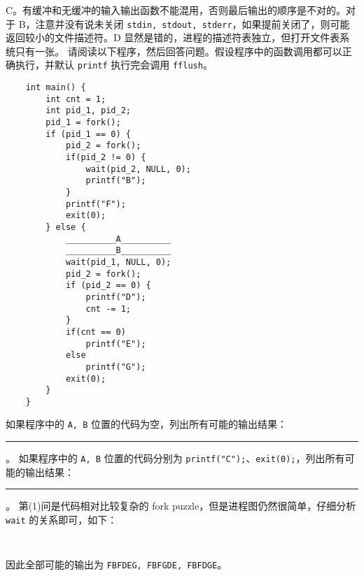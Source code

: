 \begin{problems}
\begin{choices}
        \end{choices}
        \sol C。有缓冲和无缓冲的输入输出函数不能混用，否则最后输出的顺序是不对的。对于 B，注意并没有说未关闭 \verb|stdin, stdout, stderr|，如果提前关闭了，则可能返回较小的文件描述符。D 显然是错的，进程的描述符表独立，但打开文件表系统只有一张。
         请阅读以下程序，然后回答问题。假设程序中的函数调用都可以正确执行，并默认 \verb|printf| 执行完会调用 \verb|fflush|。
        \begin{verbatim}
    int main() {
        int cnt = 1;
        int pid_1, pid_2;
        pid_1 = fork();
        if (pid_1 == 0) {
            pid_2 = fork();
            if(pid_2 != 0) {
                wait(pid_2, NULL, 0);
                printf("B");
            }
            printf("F");
            exit(0);
        } else {
            __________A__________
            __________B__________
            wait(pid_1, NULL, 0);
            pid_2 = fork();
            if (pid_2 == 0) {
                printf("D");
                cnt -= 1;
            }
            if(cnt == 0)
                printf("E");
            else
                printf("G");
            exit(0);
        }
    }
        \end{verbatim}
        \qn 如果程序中的 \verb|A, B| 位置的代码为空，列出所有可能的输出结果：\rule{3cm}{0.25mm}。
        \qn 如果程序中的 \verb|A, B| 位置的代码分别为 \verb|printf("C");|、\verb|exit(0);|，列出所有可能的输出结果：\rule{6cm}{0.25mm}。
        \sol 第(1)问是代码相对比较复杂的 fork puzzle，但是进程图仍然很简单，仔细分析 \verb|wait| 的关系即可，如下：
        \begin{figure}[H]
            \small
            \tt
            \centering
        \end{figure}
        因此全部可能的输出为 \verb|FBFDEG, FBFGDE, FBFDGE|。


\end{problems}
